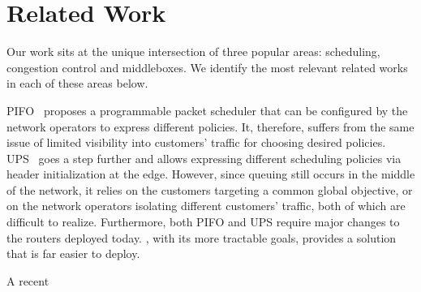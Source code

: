 \section{Related Work}
\label{s:related}

Our work sits at the unique intersection of three popular areas: scheduling, congestion control and middleboxes. We identify the most relevant related works in each of these areas below. 

 PIFO~\cite{pifo} proposes a programmable packet scheduler that can be configured by the network operators to express different policies. It, therefore, suffers from the same issue of limited visibility into customers' traffic for choosing desired policies. UPS~\cite{ups} goes a step further and allows expressing different scheduling policies via header initialization at the edge. However, since queuing still occurs in the middle of the network, it relies on the customers targeting a common global objective, or on the network operators isolating different customers' traffic, both of which are difficult to realize. Furthermore, both PIFO and UPS require major changes to the routers deployed today. \name, with its more tractable goals, provides a solution that is far easier to deploy. 

 A recent 




